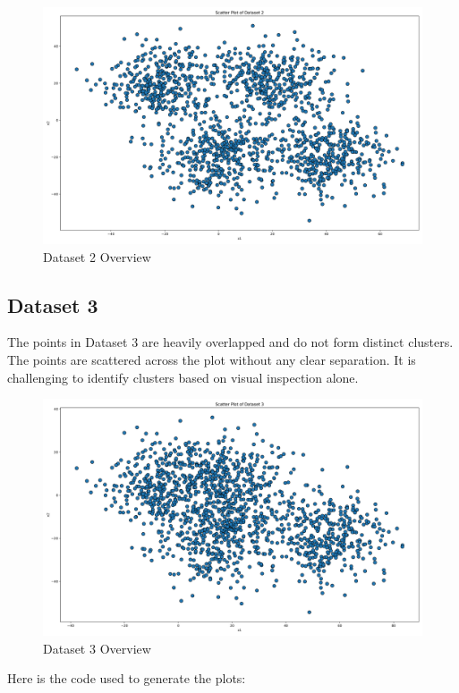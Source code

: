 \vspace{10mm}

\begin{figure}[H]
	\centering
	\includegraphics[width=0.8\linewidth]{Images/dataset-2-overview.png}
	\caption{Dataset 2 Overview}
	\label{fig:dataset-2-overview}
\end{figure}

\subsection*{Dataset 3}

The points in Dataset 3 are heavily overlapped and do not form distinct clusters. The points are scattered across the plot without any clear separation. It is challenging to identify clusters based on visual inspection alone.

\begin{figure}[H]
	\centering
	\includegraphics[width=0.8\linewidth]{Images/dataset-3-overview.png}
	\caption{Dataset 3 Overview}
	\label{fig:dataset-3-overview}
\end{figure}

\clearpage

Here is the code used to generate the plots:

